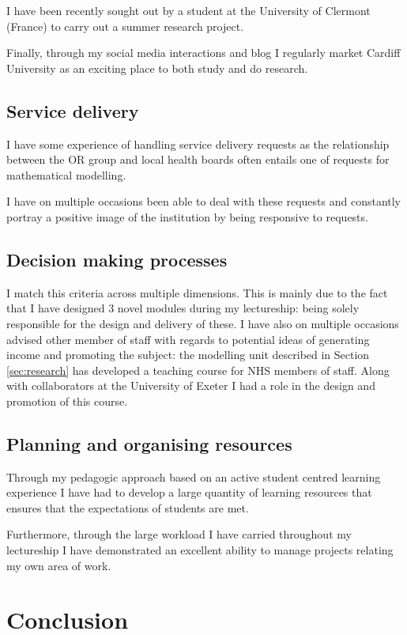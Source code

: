\documentclass{article}
\begin{document}
I have been recently sought out by a student at the University of Clermont (France) to carry out a summer research project.

Finally, through my social media interactions and blog I regularly market Cardiff University as an exciting place to both study and do research.

\subsection{Service delivery}

I have some experience of handling service delivery requests as the relationship between the OR group and local health boards often entails one of requests for mathematical modelling.

I have on multiple occasions been able to deal with these requests and constantly portray a positive image of the institution by being responsive to requests.

\subsection{Decision making processes}

I match this criteria across multiple dimensions.
This is mainly due to the fact that I have designed 3 novel modules during my lectureship: being solely responsible for the design and delivery of these.
I have also on multiple occasions advised other member of staff with regards to potential ideas of generating income and promoting the subject: the modelling unit described in Section \ref{sec:research} has developed a teaching course for NHS members of staff.
Along with collaborators at the University of Exeter I had a role in the design and promotion of this course.

\subsection{Planning and organising resources}

Through my pedagogic approach based on an active student centred learning experience I have had to develop a large quantity of learning resources that ensures that the expectations of students are met.

Furthermore, through the large workload I have carried throughout my lectureship I have demonstrated an excellent ability to manage projects relating my own area of work.

\section{Conclusion}\label{sec:conclusion}

\newpage


\end{document}
